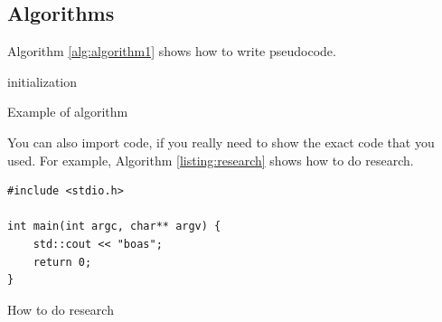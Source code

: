 \subsection{Algorithms}

Algorithm \ref{alg:algorithm1} shows how to write pseudocode.

\begin{algorithm}
 initialization\;
 \caption{Example of algorithm}
 \label{alg:algorithm1}
\end{algorithm}

You can also import code, if you really need to show the exact code that you used. For example, Algorithm \ref{listing:research} shows how to do research.

\begin{center}
\begin{listing}[H]
\centering


\begin{verbatim}
#include <stdio.h>

int main(int argc, char** argv) {
    std::cout << "boas";
    return 0;
}
\end{verbatim}

\caption{How to do research}
\label{listing:research}
\end{listing}
\end{center}
